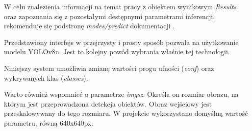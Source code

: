 W celu znalezienia informacji na temat pracy z obiektem wynikowym \emph{Results} oraz zapoznania się z pozostałymi destępnymi parametrami inferencji, rekomenduje się podstronę \emph{modes/predict} dokumentacji \cite{yolo_docs}.

Przedstawiony interfejs w przejrzysty i prosty sposób pozwala na użytkowanie modelu YOLOv8n. Jest to kolejny powód wybrania właśnie tej technologii. 

Niniejszy system umożliwia zmianę wartości progu ufności (\emph{conf}) oraz wykrywanych klas (\emph{classes}).

Warto również wspomnieć o parametrze \emph{imgsz}. Określa on rozmiar obrazu, na którym jest przeprowadzona detekcja obiektów. Obraz wejściowy jest przeskalowywany do tego rozmiaru. W projekcie wykorzystano domyślną wartość parametru, równą 640x640px.